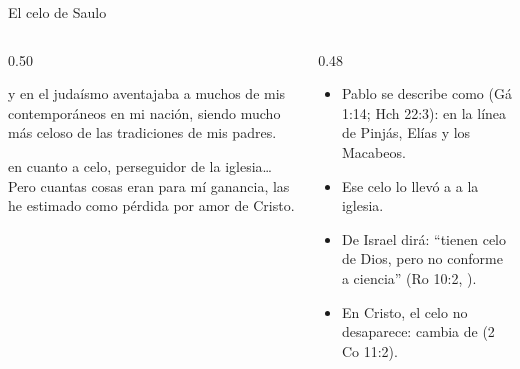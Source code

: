 \begin{frame}{El celo de Saulo}
\begin{columns}[t,onlytextwidth]
\begin{column}{0.50\textwidth}
\begin{cita}y en el judaísmo aventajaba a muchos de mis contemporáneos en mi nación, siendo mucho más celoso de las tradiciones de mis padres.\end{cita}
\begin{cita}en cuanto a celo, perseguidor de la iglesia\ldots{} Pero cuantas cosas eran para mí ganancia, las he estimado como pérdida por amor de Cristo.\end{cita}
\end{column}
\begin{column}{0.48\textwidth}\small
\begin{itemize}
\item Pablo se describe como  (Gá 1:14; Hch 22:3): en la línea de Pinjás, Elías y los Macabeos.
\item Ese celo lo llevó a  a la iglesia.
\item De Israel dirá: ``tienen celo de Dios, pero no conforme a ciencia'' (Ro 10:2, ).
\item En Cristo, el celo no desaparece: cambia de  (2 Co 11:2).
\end{itemize}
\end{column}
\end{columns}
\end{frame}

